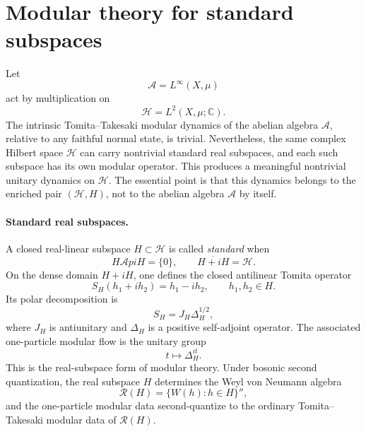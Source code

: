 \documentclass[a4paper,11pt]{article}
\theoremstyle{definition}
\newcommand{\cH}{\mathcal{H}}
\begin{document}



\section{Modular theory for standard subspaces}


Let
\[
    \mathcal{A}=L^\infty(X,\mu)
\]
act by multiplication on
\[
    \cH=L^2(X,\mu;\mathbb{C}).
\]
The intrinsic Tomita--Takesaki modular dynamics of the abelian algebra \(\mathcal{A}\), relative to any faithful normal state, is trivial. Nevertheless, the same complex Hilbert space \(\cH\) can carry nontrivial standard real subspaces, and each such subspace has its own modular operator. This produces a meaningful nontrivial unitary dynamics on \(\cH\). The essential point is that this dynamics belongs to the enriched pair \((\cH,H)\), not to the abelian algebra \(\mathcal{A}\) by itself.

\paragraph{Standard real subspaces.}
A closed real-linear subspace \(H\subset\cH\) is called \emph{standard} when
\[
    H\mathcal{A}p iH=\{0\},
    \qquad
    \overline{H+iH}=\cH.
\]
On the dense domain \(H+iH\), one defines the closed antilinear Tomita operator
\[
    S_H(h_1+ih_2)=h_1-ih_2,
    \qquad h_1,h_2\in H.
\]
Its polar decomposition is
\[
    S_H=J_H\Delta_H^{1/2},
\]
where \(J_H\) is antiunitary and \(\Delta_H\) is a positive self-adjoint operator. The associated one-particle modular flow is the unitary group
\[
    t\longmapsto \Delta_H^{it}.
\]
This is the real-subspace form of modular theory. Under bosonic second quantization, the real subspace \(H\) determines the Weyl von Neumann algebra
\[
    \mathcal{R}(H)=\{W(h):h\in H\}'',
\]
and the one-particle modular data second-quantize to the ordinary Tomita--Takesaki modular data of \(\mathcal{R}(H)\).
\end{document}
